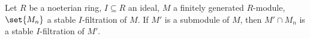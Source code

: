 Let $R$ be a noeterian ring, $I \subseteq R$ an ideal, $M$ a finitely generated
$R$-module, $\set{M_n}$ a stable $I$-filtration of $M$. If $M'$ is a submodule
of $M$, then ${M'\cap M_n}$ is a stable  $I$-filtration of $M'$.
